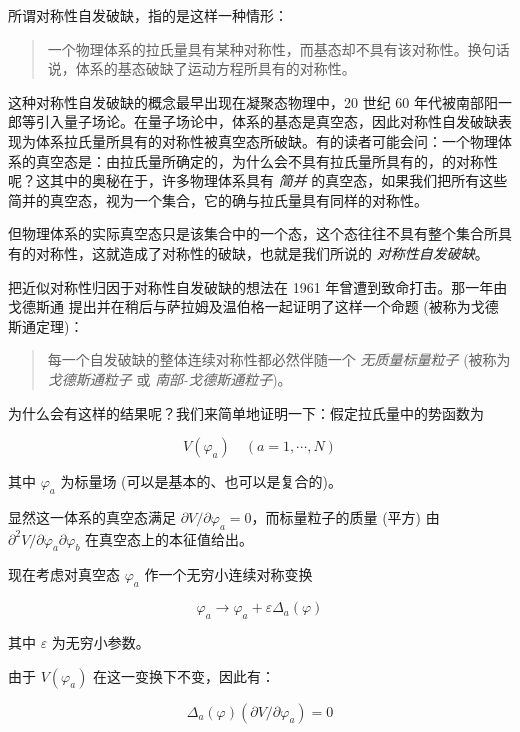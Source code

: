 \documentclass[oneside,a4paper,openany,11pt]{ctexbook}
\begin{document}
所谓对称性自发破缺，指的是这样一种情形：

\begin{quote}
    一个物理体系的拉氏量具有某种对称性，而基态却不具有该对称性。换句话说，体系的基态破缺了运动方程所具有的对称性。
\end{quote}

这种对称性自发破缺的概念最早出现在凝聚态物理中，20 世纪 60 年代被南部阳一郎等引入量子场论。在量子场论中，体系的基态是真空态，因此对称性自发破缺表现为体系拉氏量所具有的对称性被真空态所破缺。有的读者可能会问：一个物理体系的真空态是：由拉氏量所确定的，为什么会不具有拉氏量所具有的，的对称性呢？这其中的奥秘在于，许多物理体系具有 \emph{简并} 的真空态，如果我们把所有这些简并的真空态，视为一个集合，它的确与拉氏量具有同样的对称性。

但物理体系的实际真空态只是该集合中的一个态，这个态往往不具有整个集合所具有的对称性，这就造成了对称性的破缺，也就是我们所说的 \emph{对称性自发破缺}。

把近似对称性归因于对称性自发破缺的想法在 1961 年曾遭到致命打击。那一年由戈德斯通
提出并在稍后与萨拉姆及温伯格一起证明了这样一个命题 (被称为戈德斯通定理)：

\begin{quote}
    每一个自发破缺的整体连续对称性都必然伴随一个 \emph{无质量标量粒子} (被称为 \emph{戈德斯通粒子} 或 \emph{南部-戈德斯通粒子})。
\end{quote}

为什么会有这样的结果呢？我们来简单地证明一下：假定拉氏量中的势函数为

\begin{equation}
    V(\varphi_a) \quad (a=1, \cdots, N)
\end{equation}

\noindent 其中 $\varphi_a$ 为标量场 (可以是基本的、也可以是复合的)。

显然这一体系的真空态满足 $\partial V/\partial \varphi_a=0$，而标量粒子的质量 (平方) 由 $\partial^2 V/\partial \varphi_a \partial \varphi_b$ 在真空态上的本征值给出。

现在考虑对真空态 $\varphi_a$ 作一个无穷小连续对称变换

\begin{equation}
    \varphi_a \to \varphi_a + \varepsilon \Delta_a(\varphi)
\end{equation}

\noindent 其中 $\varepsilon$ 为无穷小参数。

由于 $V(\varphi_a)$ 在这一变换下不变，因此有：

\begin{equation}
    \Delta_a(\varphi) (\partial V/\partial \varphi_a)=0
\end{equation}
\end{document}
